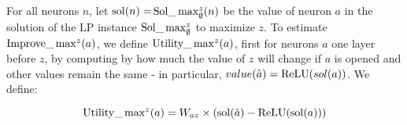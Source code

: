 \iffalse
\begin{align*}
	|(I_X - \sum_{b\in X} I_b)/I_X| < 1\%. \ (\text{in experiments})
\end{align*} Even $X$ contains neurons from 3 layers before the target layer, in experiments, $I_X$ is still close to $\sum_{b\in X} I_b$.

Therefore, based on this observation, the question to choose $X$ is converted to compute $I_b$ for neurons $b$ in layers before the target layer. Our formula is to estimate the improvement of different individual neurons in different layers. For different layers, the formula will be different.  However, neither the observation in this subsection nor the formula in the next subsection has solid theoretical proof to show that they are very accurate. They are all based on experiments. 


In our algorithm, we will open neurons at most 3 layer3 before the target layer. So the formula will consists of three parts.


\subsubsection*{Compute the improvement of a single neuron}

\subsection*{One Layer before $z$}

\fi

For all neurons $n$, let $\mathrm{sol}(n)=$$\mathrm{Sol}\_\max_\emptyset^z(n)$ be the value of neuron $a$
in the solution of the LP instance $\mathrm{Sol}\_\max_\emptyset^z$ to maximize $z$.
To estimate $\mathrm{Improve}\_\max^z(a)$, we define $\mathrm{Utility}\_\max^z(a)$, first for neurons $a$ one layer before $z$, by computing by how much the value of $z$ will change if $a$ is opened
and other values remain the same - in particular, $value(\hat{a})=\mathrm{ReLU}(sol(a))$. We define:

	$$\mathrm{Utility}\_\max\nolimits^z(a) = W_{az} \times (\mathrm{sol}(\hat{a})- \mathrm{ReLU}(\mathrm{sol}(a)))$$
	

